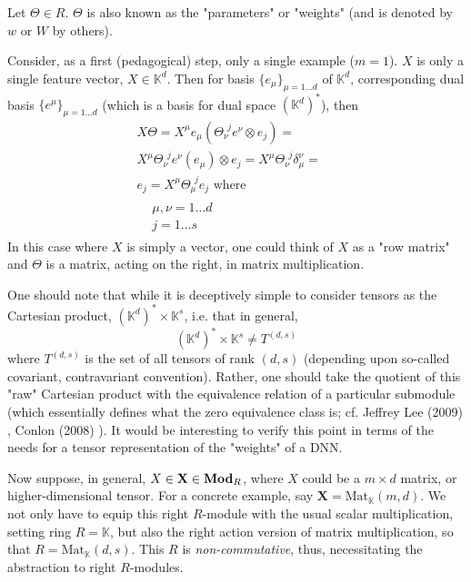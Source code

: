 \documentclass[10pt]{amsart}
\begin{document}
Let $\Theta \in R$. $\Theta$ is also known as the "parameters" or "weights" (and is denoted by $w$ or $W$ by others).  

Consider, as a first (pedagogical) step, only a single example ($m=1$).  $X$ is only a single feature vector, $X\in \mathbb{K}^d$.  Then for basis $\lbrace e_{\mu} \rbrace_{\mu=1\dots d}$ of $\mathbb{K}^d$, corresponding dual basis $\lbrace e^{\mu} \rbrace_{\mu=1\dots d}$ (which is a basis for dual space $(\mathbb{K}^d)^*$), then
\[
\begin{gathered}
	X\Theta = X^{\mu} e_{\mu} ( \Theta^{\ \   j}_{  \nu} e^{\nu}  \otimes e_j ) =  \qquad \quad \, \\
X^{\mu} \Theta^{\ \  j}_{  \nu}  e^{\nu}(e_{\mu})  \otimes e_j   = X^{\mu} \Theta^{\ \   j}_{  \nu}  \delta^{\nu}_{\mu} = \\  e_j = X^{\mu} \Theta^{\ \   j}_{ \mu} e_j  \text{ where } \\
\begin{aligned} & \mu , \nu = 1 \dots d \\ 
&  j = 1\dots s \end{aligned} 
\end{gathered}
\]
In this case where $X$ is simply a vector, one could think of $X$ as a "row matrix" and $\Theta$ is a matrix, acting on the right, in matrix multiplication.    

One should note that while it is deceptively simple to consider tensors as the Cartesian product, $(\mathbb{K}^d)^* \times \mathbb{K}^s$, i.e. that in general, 
\[
(\mathbb{K}^d)^* \times \mathbb{K}^s \neq T^{(d,s)}
\]
where $T^{(d,s)}$ is the set of all tensors of rank $(d,s)$ (depending upon so-called covariant, contravariant convention).  Rather, one should take the quotient of this "raw" Cartesian product with the equivalence relation of a particular submodule (which essentially defines what the zero equivalence class is; cf. Jeffrey Lee (2009) \cite{JLee2009}, Conlon (2008) \cite{Conl2008}).  It would be interesting to verify this point in terms of the needs for a tensor representation of the "weights" of a DNN.  

Now suppose, in general, $X \in \textbf{X} \in \text{\textbf{Mod}}_R$, where $X$ could be a $m\times d$ matrix, or higher-dimensional tensor.  For a concrete example, say $\textbf{X} = \text{Mat}_{\mathbb{K}}(m,d)$.  We not only have to equip this right $R$-module with the usual scalar multiplication, setting ring $R=\mathbb{K}$, but also the right action version of matrix multiplication, so that $R = \text{Mat}_{\mathbb{K}}(d,s)$.  This $R$ is \emph{non-commutative}, thus, necessitating the abstraction to right $R$-modules.  
\end{document}
